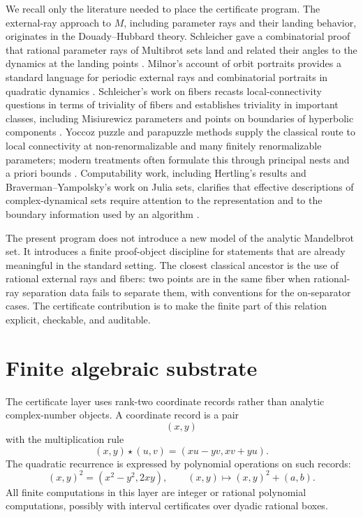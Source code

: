 \documentclass[11pt]{amsart}
\begin{document}
We recall only the literature needed to place the certificate program.  The external-ray approach to \(M\), including parameter rays and their landing behavior, originates in the Douady--Hubbard theory.  Schleicher gave a combinatorial proof that rational parameter rays of Multibrot sets land and related their angles to the dynamics at the landing points \cite{SchleicherRationalParameterRays}.  Milnor's account of orbit portraits provides a standard language for periodic external rays and combinatorial portraits in quadratic dynamics \cite{MilnorOrbitPortraits}.  Schleicher's work on fibers recasts local-connectivity questions in terms of triviality of fibers and establishes triviality in important classes, including Misiurewicz parameters and points on boundaries of hyperbolic components \cite{SchleicherFibersLC,SchleicherFibersRenormalization}.  Yoccoz puzzle and parapuzzle methods supply the classical route to local connectivity at non-renormalizable and many finitely renormalizable parameters; modern treatments often formulate this through principal nests and a priori bounds \cite{LyubichMilnorSullivan,AKLSUnicriticalLC}.  Computability work, including Hertling's results and Braverman--Yampolsky's work on Julia sets, clarifies that effective descriptions of complex-dynamical sets require attention to the representation and to the boundary information used by an algorithm \cite{HertlingMandelbrotComputable,BravermanYampolskyJuliaComputability}.

The present program does not introduce a new model of the analytic Mandelbrot set.  It introduces a finite proof-object discipline for statements that are already meaningful in the standard setting.  The closest classical ancestor is the use of rational external rays and fibers: two points are in the same fiber when rational-ray separation data fails to separate them, with conventions for the on-separator cases.  The certificate contribution is to make the finite part of this relation explicit, checkable, and auditable.

\section{Finite algebraic substrate}

The certificate layer uses rank-two coordinate records rather than analytic complex-number objects.  A coordinate record is a pair
\[
        (x,y)
\]
with the multiplication rule
\[
        (x,y)\star(u,v)=(xu-yv,xv+yu).
\]
The quadratic recurrence is expressed by polynomial operations on such records:
\[
        (x,y)^2=(x^2-y^2,2xy),\qquad
        (x,y)\mapsto (x,y)^2+(a,b).
\]
All finite computations in this layer are integer or rational polynomial computations, possibly with interval certificates over dyadic rational boxes.
\end{document}
